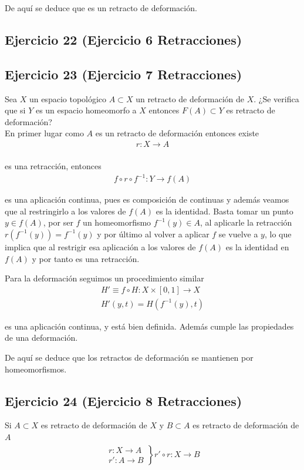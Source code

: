 \documentclass{article}
\begin{document}
De aquí se deduce que es un retracto de deformación.

\subsection{Ejercicio 22 (Ejercicio 6 Retracciones)}

\subsection{Ejercicio 23 (Ejercicio 7 Retracciones)}
Sea $X$ un espacio topológico $A\subset X$ un retracto de deformación de $X$. ¿Se verifica que si $Y$ es un espacio homeomorfo a $X$ entonces $F(A)\subset Y$ es retracto de deformación?\\

En primer lugar como $A$ es un retracto de deformación entonces existe
\begin{gather*}
r:X\rightarrow A\\
\end{gather*}

es una retracción, entonces
\begin{gather*}
f \circ r \circ f^{-1}:Y\rightarrow f(A)
\end{gather*}

es una aplicación continua, pues es composición de continuas y además veamos que al restringirlo a los valores de $f(A)$ es la identidad. Basta tomar un punto $y\in f(A)$, por ser $f$ un homeomorfismo $f^{-1}(y)\in A$, al aplicarle la retracción $r(f^{-1}(y)) = f^{-1}(y)$ y por último al volver a aplicar $f$ se vuelve a $y$, lo que implica que al restrigir esa aplicación a los valores de $f(A)$ es la identidad en $f(A)$ y por tanto es una retracción. 

Para la deformación seguimos un procedimiento similar
\begin{gather*}
H'\equiv f\circ H:X\times [0,1]\rightarrow X\\
H'(y,t)=H(f^{-1}(y),t)
\end{gather*}

es una aplicación continua, y está bien definida. Además cumple las propiedades de una deformación.

De aquí se deduce que los retractos de deformación se mantienen por homeomorfismos.

\subsection{Ejercicio 24 (Ejercicio 8 Retracciones)}
Si $A\subset X$ es retracto de deformación de $X$ y $B\subset A$ es retracto de deformación de $A$
\begin{gather*}
\left.\begin{array}{c}
r:X\rightarrow A\\
r':A\rightarrow B
\end{array}\right\rbrace r'\circ r:X\rightarrow B
\end{gather*}
\end{document}
